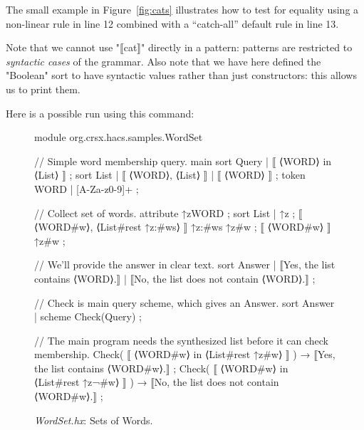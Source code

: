 \documentclass[11pt]{article} %
\begin{document}
\begin{example}
  The small example in Figure~\ref{fig:cats} illustrates how to test for equality using a
  non-linear rule in line 12 combined with a ``catch-all'' default rule in line 13.

  Note that we cannot use "⟦cat⟧" directly in a pattern: patterns are restricted to \emph{syntactic
    cases} of the grammar.  Also note that we have here defined the "Boolean" sort to have syntactic
  values rather than just constructors: this allows us to print them.

  Here is a possible run using this command:
\end{example}

\begin{figure}[p]
\begin{hacs}[numbers=right,texcl]
module org.crsx.hacs.samples.WordSet {

// Simple word membership query.
main sort Query | ⟦ ⟨WORD⟩ in ⟨List⟩ ⟧ ;
sort List | ⟦ ⟨WORD⟩, ⟨List⟩ ⟧ | ⟦ ⟨WORD⟩ ⟧ ;
token WORD | [A-Za-z0-9]+ ;

// Collect set of words.
attribute ↑z{WORD} ;
sort List | ↑z ;
⟦ ⟨WORD#w⟩, ⟨List#rest ↑z{:#ws}⟩ ⟧ ↑z{:#ws} ↑z{#w} ;
⟦ ⟨WORD#w⟩ ⟧ ↑z{#w} ;

// We'll provide the answer in clear text.
sort Answer
| ⟦Yes, the list contains ⟨WORD⟩.⟧
| ⟦No, the list does not contain ⟨WORD⟩.⟧
;

// Check is main query scheme, which gives an Answer.
sort Answer | scheme Check(Query) ;

// The main program needs the synthesized list before it can check membership.
Check( ⟦ ⟨WORD#w⟩ in ⟨List#rest ↑z{#w}⟩ ⟧ ) → ⟦Yes, the list contains ⟨WORD#w⟩.⟧ ;
Check( ⟦ ⟨WORD#w⟩ in ⟨List#rest ↑z{¬#w}⟩ ⟧ ) → ⟦No, the list does not contain ⟨WORD#w⟩.⟧ ;
}
\end{hacs}
\caption{\emph{WordSet.hx}: Sets of Words.}
\label{fig:wordset}
\end{figure}
\end{document}
